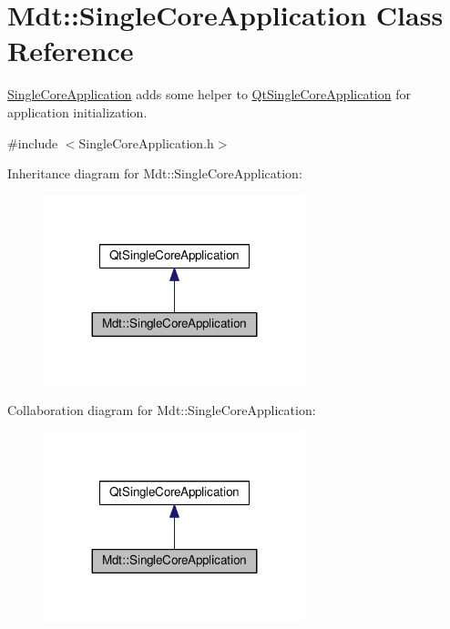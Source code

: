 \hypertarget{class_mdt_1_1_single_core_application}{}\section{Mdt\+:\+:Single\+Core\+Application Class Reference}
\label{class_mdt_1_1_single_core_application}


\hyperlink{class_mdt_1_1_single_core_application}{Single\+Core\+Application} adds some helper to \hyperlink{class_qt_single_core_application}{Qt\+Single\+Core\+Application} for application initialization.  




{\ttfamily \#include $<$Single\+Core\+Application.\+h$>$}



Inheritance diagram for Mdt\+:\+:Single\+Core\+Application\+:\nopagebreak
\begin{figure}[H]
\begin{center}
\leavevmode
\includegraphics[width=215pt]{class_mdt_1_1_single_core_application__inherit__graph}
\end{center}
\end{figure}


Collaboration diagram for Mdt\+:\+:Single\+Core\+Application\+:\nopagebreak
\begin{figure}[H]
\begin{center}
\leavevmode
\includegraphics[width=215pt]{class_mdt_1_1_single_core_application__coll__graph}
\end{center}
\end{figure}
